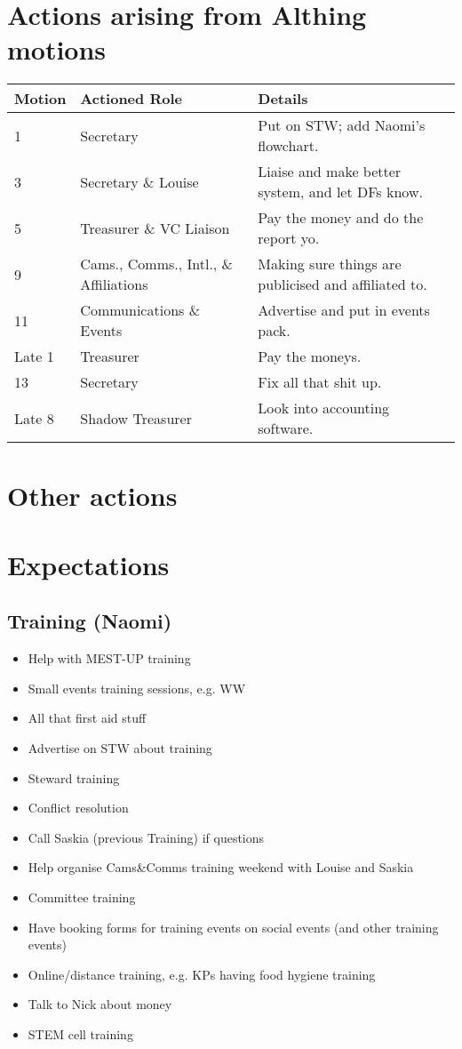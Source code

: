 \documentclass[a4paper, 11pt]{article} %
\begin{document}
\section{Actions arising from Althing motions}
\begin{center}
	\begin{tabular}[H]{l l l} \hline \hline
	\textbf{Motion}	& \textbf{Actioned Role}	& \textbf{Details} \\ \hline \hline
	1				& Secretary			& Put on STW; add Naomi's flowchart. \\
	3				& Secretary \& Louise	& Liaise and make better system, and let DFs know. \\
	5				& Treasurer \& VC Liaison	& Pay the money and do the report yo. \\
	9				& Cams., Comms., Intl., \& Affiliations & Making sure things are publicised and affiliated to. \\
	11				& Communications \& Events	& Advertise and put in events pack. \\
	Late 1			& Treasurer			& Pay the moneys. \\
	13				& Secretary			& Fix all that shit up. \\
	Late 8			& Shadow Treasurer	& Look into accounting software. \\
	\hline \hline
	\end{tabular}
\end{center}

\section{Other actions}

\section{Expectations}
\subsection{Training (Naomi)}
\begin{itemize}
	\item Help with MEST-UP training
	\item Small events training sessions, e.g. WW
	\item All that first aid stuff
	\item Advertise on STW about training
	\item Steward training
	\item Conflict resolution
	\item Call Saskia (previous Training) if questions
	\item Help organise Cams\&Comms training weekend with Louise and Saskia
	\item Committee training
	\item Have booking forms for training events on social events (and other training events)
	\item Online/distance training, e.g. KPs having food hygiene training
	\item Talk to Nick about money
	\item STEM cell training
\end{itemize}
\end{document}
